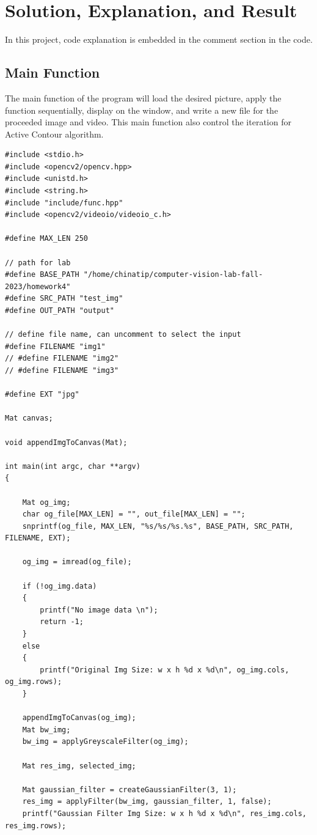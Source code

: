 \documentclass[12pt,a4paper]{report}
\begin{document}
\chapter{Solution, Explanation, and Result}
In this project, code explanation is embedded in the comment section in the code.

\section{Main Function}
The main function of the program will load the desired picture, apply the function sequentially, display on the window, and write a new file for the proceeded image and video. This main function also control the iteration for Active Contour algorithm.
\begin{lstlisting}
#include <stdio.h>
#include <opencv2/opencv.hpp>
#include <unistd.h>
#include <string.h>
#include "include/func.hpp"
#include <opencv2/videoio/videoio_c.h>

#define MAX_LEN 250

// path for lab
#define BASE_PATH "/home/chinatip/computer-vision-lab-fall-2023/homework4"
#define SRC_PATH "test_img"
#define OUT_PATH "output"

// define file name, can uncomment to select the input
#define FILENAME "img1"
// #define FILENAME "img2"
// #define FILENAME "img3"

#define EXT "jpg"

Mat canvas;

void appendImgToCanvas(Mat);

int main(int argc, char **argv)
{

    Mat og_img;
    char og_file[MAX_LEN] = "", out_file[MAX_LEN] = "";
    snprintf(og_file, MAX_LEN, "%s/%s/%s.%s", BASE_PATH, SRC_PATH, FILENAME, EXT);

    og_img = imread(og_file);

    if (!og_img.data)
    {
        printf("No image data \n");
        return -1;
    }
    else
    {
        printf("Original Img Size: w x h %d x %d\n", og_img.cols, og_img.rows);
    }

    appendImgToCanvas(og_img);
    Mat bw_img;
    bw_img = applyGreyscaleFilter(og_img);

    Mat res_img, selected_img;

    Mat gaussian_filter = createGaussianFilter(3, 1);
    res_img = applyFilter(bw_img, gaussian_filter, 1, false);
    printf("Gaussian Filter Img Size: w x h %d x %d\n", res_img.cols, res_img.rows);


\end{lstlisting}
\end{document}
